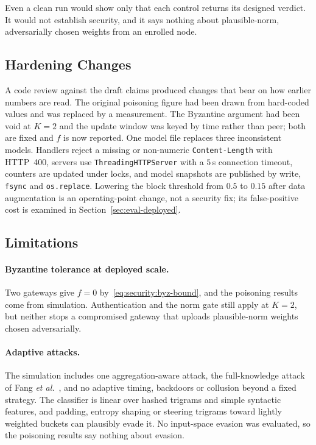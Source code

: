 Even a clean run would show only that each control returns its designed verdict. It would not establish security, and it says nothing about plausible-norm, adversarially chosen weights from an enrolled node.

\subsection{Hardening Changes}
\label{sec:sec-audit}
A code review against the draft claims produced changes that bear on how earlier numbers are read. The original poisoning figure had been drawn from hard-coded values and was replaced by a measurement. The Byzantine argument had been void at $K=2$ and the update window was keyed by time rather than peer; both are fixed and $f$ is now reported. One model file replaces three inconsistent models. Handlers reject a missing or non-numeric \texttt{Content-Length} with HTTP~400, servers use \texttt{ThreadingHTTPServer} with a $5$\,s connection timeout, counters are updated under locks, and model snapshots are published by write, \texttt{fsync} and \texttt{os.replace}. Lowering the block threshold from $0.5$ to $0.15$ after data augmentation is an operating-point change, not a security fix; its false-positive cost is examined in Section~\ref{sec:eval-deployed}.

\subsection{Limitations}
\label{sec:sec-limits}
\paragraph{Byzantine tolerance at deployed scale.}
Two gateways give $f=0$ by~\eqref{eq:security:byz-bound}, and the poisoning results come from simulation. Authentication and the norm gate still apply at $K=2$, but neither stops a compromised gateway that uploads plausible-norm weights chosen adversarially.

\paragraph{Adaptive attacks.}
The simulation includes one aggregation-aware attack, the full-knowledge attack of Fang \textit{et al.}~\cite{fang2020}, and no adaptive timing, backdoors or collusion beyond a fixed strategy. The classifier is linear over hashed trigrams and simple syntactic features, and padding, entropy shaping or steering trigrams toward lightly weighted buckets can plausibly evade it. No input-space evasion was evaluated, so the poisoning results say nothing about evasion.

